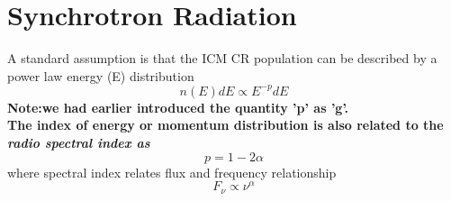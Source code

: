 \documentclass[12pt]{report}
\newcommand{\tit}[1]{\textit{#1}}
\begin{document}
\section{Synchrotron Radiation}
 A standard assumption is that the ICM CR population can be described by a power law energy (E) distribution 
 \begin{equation}
 n(E)dE\propto E^{-p}dE
 \end{equation}
 \textbf{Note:we had earlier introduced the quantity 'p' as 'g'.}\\
 \textbf{The index of energy or momentum distribution is also related to the \tit{radio spectral index as}}
 \begin{equation}
 p=1-2\alpha
 \end{equation}
 where spectral index relates flux and frequency relationship
 \begin{equation}
 F_\nu \propto \nu^\alpha
 \end{equation}
\end{document}
